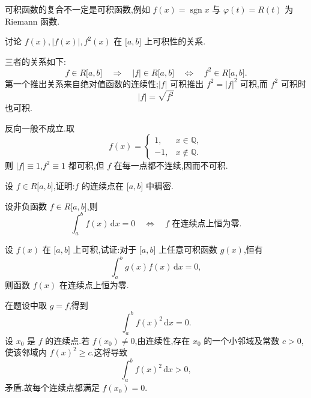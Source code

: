 \begin{remark}
    可积函数的复合不一定是可积函数,例如 $f(x)=\operatorname{sgn}x$ 与 $\varphi(t)=R(t)$ 为 Riemann 函数.
\end{remark}

\begin{example}[\markstar]
    讨论 $f(x),|f(x)|,f^2(x)$ 在 $\lbrack a,b\rbrack$ 上可积性的关系.
\end{example}
\exampleblank

\begin{solution}
    三者的关系如下:
    \[
        f\in R\lbrack a,b\rbrack
        \quad\Longrightarrow\quad
        |f|\in R\lbrack a,b\rbrack
        \quad\Longleftrightarrow\quad
        f^2\in R\lbrack a,b\rbrack.
    \]
    第一个推出关系来自绝对值函数的连续性;$|f|$ 可积推出 $f^2=|f|^2$ 可积,而 $f^2$ 可积时
    \[
        |f|=\sqrt{f^2}
    \]
    也可积.

    反向一般不成立.取
    \[
        f(x)=
        \begin{cases}
            1,  & x\in\mathbb{Q},    \\
            -1, & x\notin\mathbb{Q}.
        \end{cases}
    \]
    则 $|f|\equiv1$,$f^2\equiv1$ 都可积,但 $f$ 在每一点都不连续,因而不可积.
\end{solution}

\begin{proposition}[\markstar]
    设 $f\in R\lbrack a,b\rbrack$,证明:$f$ 的连续点在 $\lbrack a,b\rbrack$ 中稠密.
\end{proposition}

\begin{corollary}[\markstar]
    设非负函数 $f\in R\lbrack a,b\rbrack$,则
    \[
        \displaystyle\int_a^b f(x)\,\mathrm{d}x=0
        \quad\Longleftrightarrow\quad
        f\text{ 在连续点上恒为零}.
    \]
\end{corollary}

\begin{example}
    设 $f(x)$ 在 $\lbrack a,b\rbrack$ 上可积,试证:对于 $\lbrack a,b\rbrack$ 上任意可积函数 $g(x)$,恒有
    \[
        \displaystyle\int_a^b g(x)f(x)\,\mathrm{d}x=0,
    \]
    则函数 $f(x)$ 在连续点上恒为零.
\end{example}
\exampleblank

\begin{solution}
    在题设中取 $g=f$,得到
    \[
        \displaystyle\int_a^b f(x)^2\,\mathrm{d}x=0.
    \]
    设 $x_0$ 是 $f$ 的连续点.若 $f(x_0)\neq0$,由连续性,存在 $x_0$ 的一个小邻域及常数 $c>0$,使该邻域内 $f(x)^2\geq c$.这将导致
    \[
        \displaystyle\int_a^b f(x)^2\,\mathrm{d}x>0,
    \]
    矛盾.故每个连续点都满足 $f(x_0)=0$.
\end{solution}

